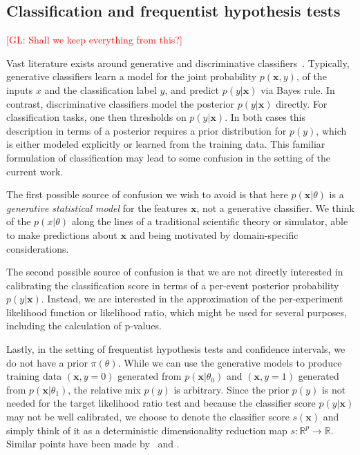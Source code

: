 \documentclass[12pt]{article}
\numberwithin{equation}{section}
\theoremstyle{plain}
\newcommand{\glnote}[1]{\textcolor{red}{[GL: #1]}}
\begin{document}
\subsection{Classification and frequentist hypothesis tests}

\glnote{Shall we keep everything from this?}

Vast literature exists around generative and discriminative
classifiers~\citep{AndrewY.Ng}. Typically, generative classifiers learn a model
for the joint probability $p(\mathbf{x}, y)$, of the inputs $x$ and the classification
label $y$, and predict $p(y|\mathbf{x})$ via Bayes rule. In contrast, discriminative
classifiers model the posterior $p(y|\mathbf{x})$ directly. For classification tasks, one
then thresholds on $p(y|\mathbf{x})$. In both cases this description in terms of a
posterior requires a prior distribution for $p(y)$, which is either modeled
explicitly or learned from the training data. This familiar formulation of
classification may lead to some confusion in the setting of the current work.

The first possible source of confusion we wish to avoid is that here
$p(\mathbf{x}|\theta)$  is a  \textit{generative statistical model} for the features $\mathbf{x}$,
not a generative classifier. We think of the  $p(x|\theta)$ along the lines of a
traditional scientific theory or simulator, able to make predictions about $\mathbf{x}$
and being motivated by domain-specific considerations.

The second possible source of confusion is that we are not directly interested
in calibrating the classification score in terms of a per-event posterior
probability $p(y|\mathbf{x})$. Instead, we are interested in the approximation of the
per-experiment likelihood function or likelihood ratio, which might be used for
several purposes, including the calculation of p-values.

Lastly, in the setting of frequentist hypothesis tests and confidence intervals,
we do not have a prior $\pi(\theta)$. While we can use the generative models to
produce training data $(\mathbf{x} ,y=0)$ generated from
$p(\mathbf{x}|\theta_0)$ and $(\mathbf{x}, y=1)$ generated from
$p(\mathbf{x}|\theta_1)$, the relative mix $p(y)$ is arbitrary. Since the prior
$p(y)$ is not needed for the target likelihood ratio test and because the
classifier score $p(y|\mathbf{x})$ may not be well calibrated, we choose to denote the
classifier score $s(\mathbf{x})$ and simply think of it as a deterministic dimensionality
reduction map $s: \mathbb{R}^p \to \mathbb{R}$.  Similar points have been made
by~\cite{ClaytonScott} and \cite{Neal:2007zz}.
\end{document}
